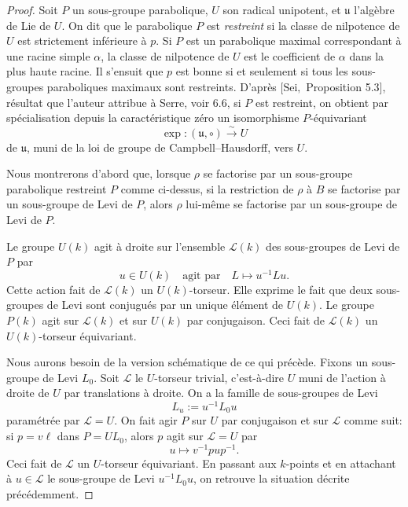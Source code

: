 \documentclass[11pt]{article}
\begin{document}
\begin{proof}
Soit \(P\) un sous-groupe parabolique, \(U\) son radical unipotent, et
\(\mathfrak u\) l'algèbre de Lie de \(U\). On dit que le parabolique \(P\) est
\emph{restreint} si la classe de nilpotence de \(U\) est strictement inférieure à
\(p\). Si \(P\) est un parabolique maximal correspondant à une racine simple
\(\alpha\), la classe de nilpotence de \(U\) est le coefficient de \(\alpha\) dans la
plus haute racine. Il s'ensuit que \(p\) est bonne si et seulement si tous les
sous-groupes paraboliques maximaux sont restreints. D'après \([\mathrm{Sei},\)
Proposition 5.3], résultat que l'auteur attribue à Serre, voir 6.6, si \(P\) est
restreint, on obtient par spécialisation depuis la caractéristique zéro un isomorphisme
\(P\)-équivariant
\begin{equation}
  \exp:(\mathfrak u,\circ)\xrightarrow{\sim} U
  \tag{4.2.2}
\end{equation}
de \(\mathfrak u\), muni de la loi de groupe de Campbell--Hausdorff, vers \(U\).

Nous montrerons d'abord que, lorsque \(\rho\) se factorise par un sous-groupe
parabolique restreint \(P\) comme ci-dessus, si la restriction de \(\rho\) à \(B\) se
factorise par un sous-groupe de Levi de \(P\), alors \(\rho\) lui-même se factorise par
un sous-groupe de Levi de \(P\).

Le groupe \(U(k)\) agit à droite sur l'ensemble \(\mathcal L(k)\) des sous-groupes de
Levi de \(P\) par
\[
  u\in U(k) \quad\text{agit par}\quad L\longmapsto u^{-1}Lu.
\]
Cette action fait de \(\mathcal L(k)\) un \(U(k)\)-torseur. Elle exprime le fait que
deux sous-groupes de Levi sont conjugués par un unique élément de \(U(k)\). Le groupe
\(P(k)\) agit sur \(\mathcal L(k)\) et sur \(U(k)\) par conjugaison. Ceci fait de
\(\mathcal L(k)\) un \(U(k)\)-torseur équivariant.

Nous aurons besoin de la version schématique de ce qui précède. Fixons un sous-groupe
de Levi \(L_0\). Soit \(\mathcal L\) le \(U\)-torseur trivial, c'est-à-dire \(U\) muni de
l'action à droite de \(U\) par translations à droite. On a la famille de sous-groupes de
Levi
\[
  L_u:=u^{-1}L_0u
\]
paramétrée par \(\mathcal L=U\). On fait agir \(P\) sur \(U\) par conjugaison et sur
\(\mathcal L\) comme suit: si \(p=v\ell\) dans \(P=U L_0\), alors \(p\) agit sur
\(\mathcal L=U\) par
\[
  u\longmapsto v^{-1}pup^{-1}.
\]
Ceci fait de \(\mathcal L\) un \(U\)-torseur équivariant. En passant aux \(k\)-points et
en attachant à \(u\in\mathcal L\) le sous-groupe de Levi \(u^{-1}L_0u\), on retrouve
la situation décrite précédemment.


\end{proof}
\end{document}
